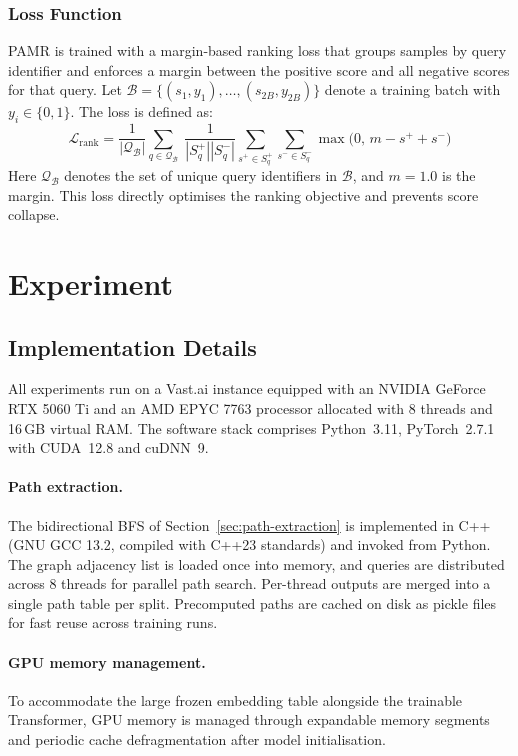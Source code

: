 \documentclass[runningheads]{llncs}
\begin{document}
\subsubsection{Loss Function}
\label{sec:loss-functions}

PAMR is trained with a margin-based ranking loss that groups samples
by query identifier and enforces a margin between the positive score
and all negative scores for that query. Let $\mathcal{B} = \{(s_1, y_1), \ldots, (s_{2B}, y_{2B})\}$
denote a training batch with $y_i \in \{0, 1\}$. The loss is defined as:
\begin{equation}
  \mathcal{L}_{\text{rank}} = \frac{1}{|\mathcal{Q}_{\mathcal{B}}|} \sum_{q \in \mathcal{Q}_{\mathcal{B}}}\; \frac{1}{|S_q^+||S_q^-|} \sum_{s^+ \in S_q^+} \sum_{s^- \in S_q^-}
  \max\bigl(0,\, m - s^+ + s^-\bigr)
  \label{eq:loss-rank}
\end{equation}
Here $\mathcal{Q}_{\mathcal{B}}$ denotes the set of unique query identifiers in $\mathcal{B}$, and
$m = 1.0$ is the margin. This loss directly optimises the ranking objective and prevents
score collapse.

\section{Experiment}
\label{sec:experiment}
\subsection{Implementation Details}
\label{sec:implementation}

All experiments run on a Vast.ai instance equipped with an NVIDIA
GeForce RTX 5060 Ti and an AMD EPYC 7763 processor allocated with 8 threads
and 16\,GB virtual RAM. The software stack comprises Python~3.11,
PyTorch~2.7.1 with CUDA~12.8 and cuDNN~9.

\paragraph{Path extraction.}
The bidirectional BFS of Section~\ref{sec:path-extraction} is
implemented in C++ (GNU GCC 13.2, compiled with C++23 standards)
and invoked from Python. The graph adjacency list is loaded once
into memory, and queries are distributed across 8 threads for
parallel path search. Per-thread outputs are merged into a single
path table per split. Precomputed paths are cached on disk as
pickle files for fast reuse across training runs.

\paragraph{GPU memory management.}
To accommodate the large frozen embedding table alongside the trainable
Transformer, GPU memory is managed through expandable memory segments
and periodic cache defragmentation after model initialisation.
\end{document}
